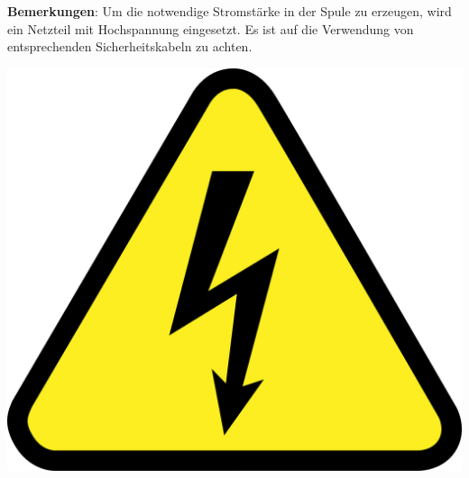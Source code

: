 \documentclass[../main.tex]{subfiles}
\begin{document}
\begin{tcolorbox}
    \vspace{0.4cm}
    \begin{minipage}[c]{0.85\textwidth}
        \textbf{Bemerkungen}: Um die notwendige Stromstärke in der Spule zu erzeugen, wird ein Netzteil mit Hochspannung eingesetzt. Es ist auf die Verwendung von entsprechenden Sicherheitskabeln zu achten.    
    \end{minipage}
    \hspace{0.5cm}
    \begin{minipage}[c]{0.1\textwidth}
        \centering
        \includegraphics[width=1\textwidth]{img/hochspannung}
    \end{minipage}

\end{tcolorbox}
\end{document}
